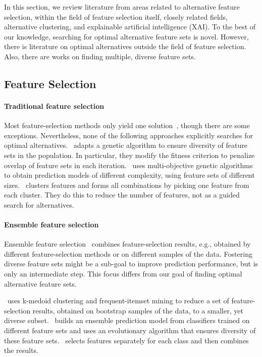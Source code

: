 \documentclass{article}
\theoremstyle{definition}
\begin{document}
In this section, we review literature from areas related to alternative feature selection, within the field of feature selection itself, closely related fields, alternative clustering, and explainable artificial intelligence (XAI).
To the best of our knowledge, searching for optimal alternative feature sets is novel.
However, there is literature on optimal alternatives outside the field of feature selection.
Also, there are works on finding multiple, diverse feature sets.

\subsection{Feature Selection}

\paragraph{Traditional feature selection}

Most feature-selection methods only yield one solution~\cite{borboudakis2021extending}, though there are some exceptions.
Nevertheless, none of the following approaches explicitly searches for optimal alternatives.
\cite{siddiqi2020genetic}~adapts a genetic algorithm to ensure diversity of feature sets in the population.
In particular, they modify the fitness criterion to penalize overlap of feature sets in each iteration.
\cite{emmanouilidis1999selecting}~uses multi-objective genetic algorithms to obtain prediction models of different complexity, using feature sets of different sizes.
\cite{mueller2021feature}~clusters features and forms all combinations by picking one feature from each cluster.
They do this to reduce the number of features, not as a guided search for alternatives.

\paragraph{Ensemble feature selection}

Ensemble feature selection~\cite{saeys2008robust, seijo2017ensemble} combines feature-selection results, e.g., obtained by different feature-selection methods or on different samples of the data.
Fostering diverse feature sets might be a sub-goal to improve prediction performance, but is only an intermediate step.
This focus differs from our goal of finding optimal alternative feature sets.

\cite{woznica2012model}~uses k-medoid clustering and frequent-itemset mining to reduce a set of feature-selection results, obtained on bootstrap samples of the data, to a smaller, yet diverse subset.
\cite{liu2019subspace}~builds an ensemble prediction model from classifiers trained on different feature sets and uses an evolutionary algorithm that ensures diversity of these feature sets.
\cite{guru2018alternative}~selects features separately for each class and then combines the results.
\end{document}
